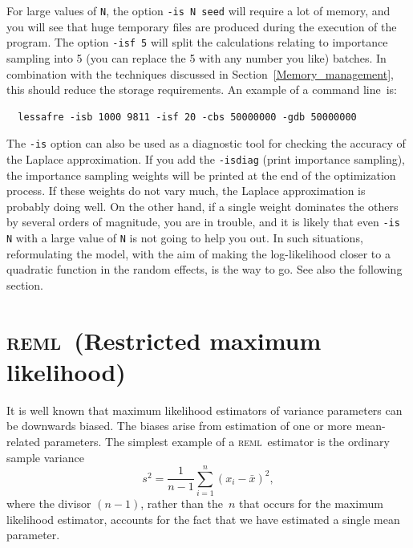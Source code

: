\documentclass{admbmanual}
\newcommand{\scREML}{\textsc{reml}}
\begin{document}
For large values of \texttt{N}, the option \texttt{-is N seed} will require a
lot of memory, and you will see that huge temporary files are produced during
the execution of the program. The option \texttt{-isf 5} will split the
calculations relating to importance sampling into 5 (you can replace the 5 with
any number you like) batches. In combination with the techniques discussed in
Section~\ref{Memory_management}, this should reduce the storage requirements. An
example of a command line~is:
\begin{lstlisting}
  lessafre -isb 1000 9811 -isf 20 -cbs 50000000 -gdb 50000000
\end{lstlisting}

The \texttt{-is} option can also be used as a diagnostic tool for checking the
accuracy of the Laplace approximation. If you add the \texttt{-isdiag} (print
importance sampling), the importance sampling weights will be printed at the end
of the optimization process. If these weights do not vary much, the Laplace
approximation is probably doing well. On the other hand, if a single weight
dominates the others by several orders of magnitude, you are in trouble, and it
is likely that even \texttt{-is N} with a large value of \texttt{N} is not going
to help you out. In such situations, reformulating the model, with the aim of
making the log-likelihood closer to a quadratic function in the random effects,
is the way to go. See also the following section.

\section{\scREML\ (Restricted maximum likelihood)}
\label{sec:reml}

It is well known that maximum likelihood estimators of variance parameters can
be downwards biased. The biases arise from estimation of one or more
mean-related parameters. The simplest example of a \scREML\ estimator is the
ordinary sample variance
$$
s^2 = \frac{1}{n-1}\sum_{i=1}^{n}(x_i-\bar x)^2,
$$
where the divisor $(n-1)$, rather than the~$n$ that occurs for the maximum
likelihood estimator, accounts for the fact that we have estimated a single mean
parameter.
\end{document}
